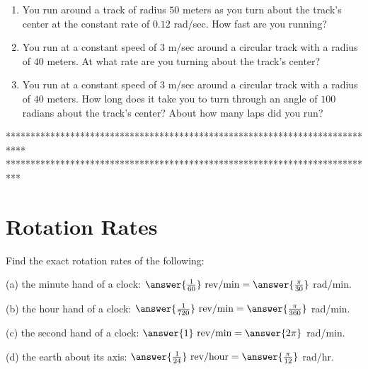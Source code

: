 \documentclass{ximera}
\begin{document}
\begin{question}  \label{Q5y345ttg354t}
\begin{enumerate}

\item You run around a track of radius $50$ meters as you turn about the track's center at the constant rate of $0.12$ rad/sec. How fast are you running?

\item You run at a constant speed of $3$ m/sec around a circular track with a radius of $40$ meters. At what rate are you turning about the track's center?

\item You run at a constant speed of $3$ m/sec around a circular track with a radius of $40$ meters. How long does it take you to turn through an angle of $100$ radians about the track's center? About how many laps did you run?

\end{enumerate}
\end{question}
















\iffalse
****************************************************************************
***************************************************************************


\section{Rotation Rates}
\begin{question}  \label{Q245: Angles}
Find the exact rotation rates of the following:

(a) the minute hand of a clock: $\answer{\frac{1}{60}} \text{ rev/min} = \answer{\frac{\pi}{30}}$ rad/min. 

(b) the hour hand of a clock: $\answer{\frac{1}{720}} \text{ rev/min} =\answer{\frac{\pi}{360}}$ rad/min. 

(c) the second hand of a clock: $\answer{1} \text{ rev/min} =\answer{2\pi}$ rad/min. 

(d) the earth about its axis: $\answer{\frac{1}{24}} \text{ rev/hour} =\answer{\frac{\pi}{12}}$ rad/hr.

\end{question}
\end{document}
